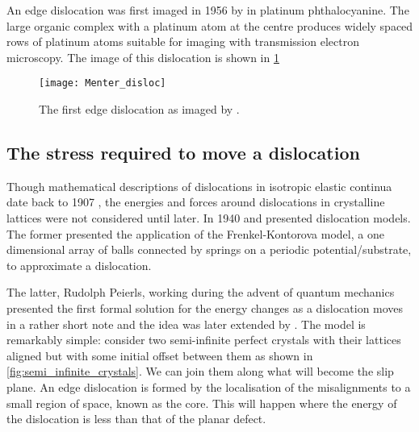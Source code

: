 An edge dislocation was first imaged in 1956 by \citet{Menter1956} in platinum phthalocyanine. The large organic complex with a platinum atom at the centre produces widely spaced rows of platinum atoms suitable for imaging with transmission electron microscopy. The image of this dislocation is shown in \ref{fig:Menter_disloc}

\begin{figure}
\centering
\texttt{[image: Menter\_disloc]}
\caption{The first edge dislocation as imaged by \citet{Menter1956}.\label{fig:Menter_disloc}}
\end{figure}





\subsection{The stress required to move a dislocation}



Though mathematical descriptions of dislocations in isotropic elastic continua date back to 1907 \cite{Volterra1907}, the energies and forces around dislocations in crystalline lattices were not considered until later. In 1940 \citet{Dehlinger1940} and \citet{Peierls1940} presented dislocation models. The former presented the application of the Frenkel-Kontorova model, a one dimensional array of balls connected by springs on a periodic potential/substrate, to approximate a dislocation.

The latter, Rudolph Peierls, working during the advent of quantum mechanics presented the first formal solution for the energy changes as a dislocation moves in a rather short note \cite{Peierls1940} and the idea was later extended by \citet{Nabarro1947}. The model is remarkably simple: consider two semi-infinite perfect crystals with their lattices aligned but with some initial offset between them as shown in \autoref{fig:semi_infinite_crystals}. We can join them along what will become the slip plane. An edge dislocation is formed  by the localisation of the misalignments to a small region of space, known as the core. This will happen where the energy of the dislocation is less than that of the planar defect.



